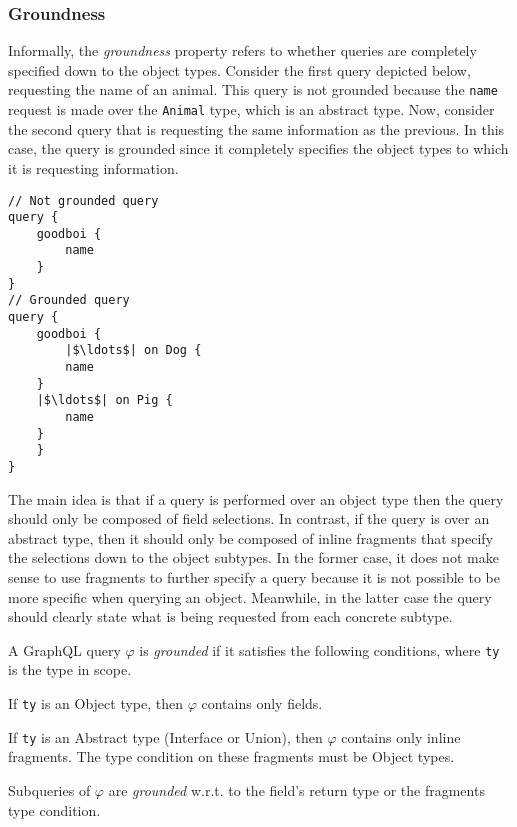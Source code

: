 \subsubsection*{Groundness}

Informally, the \textit{groundness} property refers to whether queries are completely specified down to the object types.  Consider the first query depicted below, requesting the name of an animal. This query is not grounded because the \texttt{name} request is made over the \texttt{Animal} type, which is an abstract type. Now, consider the second query that is requesting the same information as the previous. In this case, the query is grounded since it completely specifies the object types to which it is requesting information.

\begin{verbatim}
// Not grounded query
query {
    goodboi {
        name
    }
}
// Grounded query
query {
    goodboi {
        |$\ldots$| on Dog {
	    name
	}
	|$\ldots$| on Pig {
	    name
	}
    }	
}
\end{verbatim} 

The main idea is that if a query is performed over an object type then the query should only be composed of field selections. In contrast, if the query is over an abstract type, then it should only be composed of inline fragments that specify the selections down to the object subtypes. In the former case, it does not make sense to use fragments to further specify a query because it is not possible to be more specific when querying an object. Meanwhile, in the latter case the query should clearly state what is being requested from each concrete subtype.

\begin{definition}
A GraphQL query $\varphi$ is \textit{grounded} if it satisfies the following conditions, where \texttt{ty} is the type in scope.
\item If \texttt{ty} is an Object type, then $\varphi$ contains only fields.
\item If \texttt{ty} is an Abstract type (Interface or Union), then $\varphi$ contains only inline fragments. The type condition on these fragments must be Object types.
\item Subqueries of $\varphi$ are \textit{grounded} w.r.t. to the field's return type or the fragments type condition.
\end{definition}

